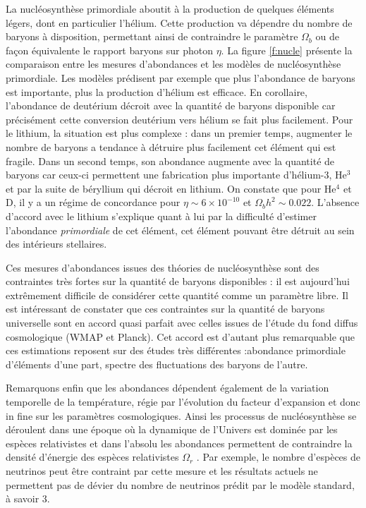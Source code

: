 La nucléosynthèse primordiale aboutit à la production de quelques éléments légers, dont en particulier l'hélium. Cette production va dépendre du nombre de baryons à disposition, permettant ainsi de contraindre le paramètre $\Omega_b$ ou de façon équivalente le rapport baryons sur photon $\eta$. La figure \ref{f:nucle} présente la comparaison entre les mesures d'abondances et les modèles de nucléosynthèse primordiale. Les modèles prédisent par exemple que plus l'abondance de baryons est importante, plus la production d'hélium est efficace. En corollaire, l'abondance de deutérium décroit avec la quantité de baryons disponible car précisément cette conversion deutérium vers hélium se fait plus facilement. Pour le lithium, la situation est plus complexe : dans un premier temps, augmenter le nombre de baryons a tendance à détruire plus facilement cet élément qui est fragile. Dans un second temps, son abondance augmente avec la quantité de baryons car ceux-ci permettent une fabrication plus importante d’hélium-3, He$^3$ et par la suite de béryllium qui décroit en lithium. On constate que pour He$^4$ et D, il y a un régime de concordance pour $\eta \sim 6\times 10^{-10}$ et $\Omega_b h^2\sim 0.022$. L'absence d'accord avec le lithium s'explique quant à lui par la difficulté d'estimer l'abondance \textit{primordiale} de cet élément, cet élément pouvant être détruit au sein des intérieurs stellaires. 

Ces mesures d'abondances issues des théories de nucléosynthèse sont des contraintes très fortes sur la quantité de baryons disponibles : il est aujourd'hui extrêmement difficile de considérer cette quantité comme un paramètre libre. Il est intéressant de constater que ces contraintes sur la quantité de baryons universelle sont en accord quasi parfait avec celles issues de l'étude du fond diffus cosmologique (WMAP et Planck). Cet accord est d'autant plus remarquable que ces estimations reposent sur des études très différentes :abondance primordiale d'éléments d'une part, spectre des fluctuations des baryons de l'autre.

Remarquons enfin que les abondances dépendent également de la variation temporelle de la température, régie par l'évolution du facteur d'expansion et donc in fine sur les paramètres cosmologiques. Ainsi les processus de nucléosynthèse se déroulent dans une époque où la dynamique de l'Univers est dominée par les espèces relativistes et dans l'absolu les abondances permettent de contraindre la densité d'énergie des espèces relativistes $\Omega_r$ . Par exemple, le nombre d'espèces de neutrinos peut être contraint par cette mesure et les résultats actuels ne permettent pas de dévier du nombre de neutrinos prédit par le modèle standard, à savoir 3.


